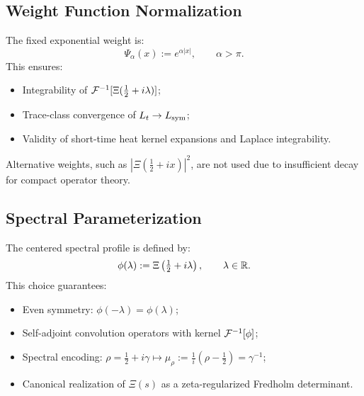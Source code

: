 \subsection*{Weight Function Normalization}

The fixed exponential weight is:
\[
\Psi_\alpha(x) := e^{\alpha |x|}, \qquad \alpha > \pi.
\]
This ensures:
\begin{itemize}
  \item Integrability of \( \mathcal{F}^{-1}[\Xi(\tfrac{1}{2} + i\lambda)] \);
  \item Trace-class convergence of \( L_t \to L_{\mathrm{sym}} \);
  \item Validity of short-time heat kernel expansions and Laplace integrability.
\end{itemize}

Alternative weights, such as \( |\Xi(\tfrac{1}{2} + ix)|^2 \), are not used due to insufficient decay for compact operator theory.

\subsection*{Spectral Parameterization}

The centered spectral profile is defined by:
\[
\phi(\lambda) := \Xi\left( \tfrac{1}{2} + i\lambda \right), \qquad \lambda \in \mathbb{R}.
\]
This choice guarantees:
\begin{itemize}
  \item Even symmetry: \( \phi(-\lambda) = \phi(\lambda) \);
  \item Self-adjoint convolution operators with kernel \( \mathcal{F}^{-1}[\phi] \);
  \item Spectral encoding: \( \rho = \tfrac{1}{2} + i\gamma \mapsto \mu_\rho := \tfrac{1}{i}(\rho - \tfrac{1}{2}) = \gamma^{-1} \);
  \item Canonical realization of \( \Xi(s) \) as a zeta-regularized Fredholm determinant.
\end{itemize}
